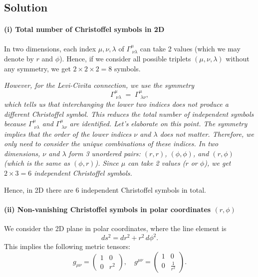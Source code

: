 \subsection*{Solution}

\paragraph{(i) Total number of Christoffel symbols in 2D}
In two dimensions, each index \(\mu, \nu, \lambda\) of \(\Gamma^\mu_{\;\nu\lambda}\) can take 2 values (which we may denote by \(r\) and \(\phi\)). Hence, if we consider all possible triplets \((\mu,\nu,\lambda)\) without any symmetry, we get \(2 \times 2 \times 2 = 8\) symbols.

\emph{However, for the Levi-Civita connection, we use the symmetry}
\[
\Gamma^\mu_{\;\nu\lambda} \;=\; \Gamma^\mu_{\;\lambda\nu},
\]
\emph{which tells us that interchanging the lower two indices does not produce a different Christoffel symbol. This reduces the total number of \emph{independent} symbols because \(\Gamma^\mu_{\;\nu\lambda}\) and \(\Gamma^\mu_{\;\lambda\nu}\) are identified. Let's elaborate on this point. The symmetry implies that the order of the lower indices \(\nu\) and \(\lambda\) does not matter. Therefore, we only need to consider the unique combinations of these indices. In two dimensions, \(\nu\) and \(\lambda\) form 3 unordered pairs: \((r,r)\), \((\phi,\phi)\), and \((r,\phi)\) (which is the same as \((\phi, r)\)). Since \(\mu\) can take 2 values (\(r\) or \(\phi\)), we get \(2 \times 3 = 6\) independent Christoffel symbols.}

Hence, in 2D there are \(\boxed{6}\) independent Christoffel symbols in total.

\bigskip

\paragraph{(ii) Non-vanishing Christoffel symbols in polar coordinates \((r,\phi)\)}

We consider the 2D plane in polar coordinates, where the line element is
\[
ds^2 = dr^2 + r^2\,d\phi^2.
\]
This implies the following metric tensors:
\[
g_{\mu\nu}
=
\begin{pmatrix}
1 & 0 \\
0 & r^2
\end{pmatrix},
\quad
g^{\mu\nu}
=
\begin{pmatrix}
1 & 0 \\
0 & \frac{1}{r^2}
\end{pmatrix}.
\]

